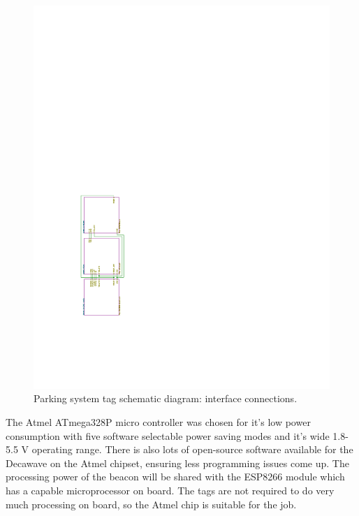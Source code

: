 \begin{figure}[H]
\begin{center}
\includegraphics[page=1,scale=1.5,trim={3cm 5cm 15cm 13cm},clip,angle=-90]{data/parking-system2.pdf}
\caption{Parking system tag schematic diagram: interface connections.}
\label{fig:interface-conn}
\end{center}
\end{figure}

The Atmel ATmega328P micro controller was chosen for it's low power consumption with five software selectable power saving modes and it's wide 1.8-5.5 V operating range.\cite{atmel} There is also lots of open-source software available for the Decawave on the Atmel chipset, ensuring less programming issues come up. The processing power of the beacon will be shared with the ESP8266 module which has a capable microprocessor on board. The tags are not required to do very much processing on board, so the Atmel chip is suitable for the job.

